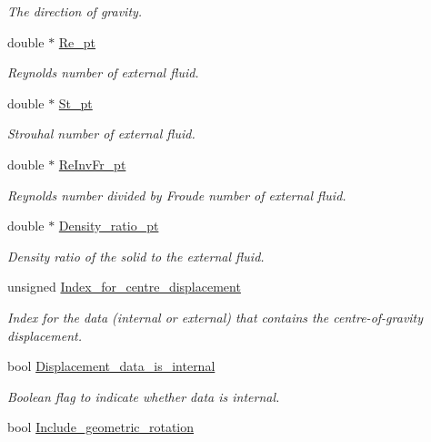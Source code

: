 \begin{DoxyCompactItemize}
\begin{DoxyCompactList}\small\item\em The direction of gravity. \end{DoxyCompactList}\item 
double $\ast$ \hyperlink{classoomph_1_1ImmersedRigidBodyElement_a90b0f294088777736260ffc4922af431}{Re\+\_\+pt}
\begin{DoxyCompactList}\small\item\em Reynolds number of external fluid. \end{DoxyCompactList}\item 
double $\ast$ \hyperlink{classoomph_1_1ImmersedRigidBodyElement_a200f179da0403fd3af0076200832a2ac}{St\+\_\+pt}
\begin{DoxyCompactList}\small\item\em Strouhal number of external fluid. \end{DoxyCompactList}\item 
double $\ast$ \hyperlink{classoomph_1_1ImmersedRigidBodyElement_a592e3846e9894c23cb6bb232d342eb20}{Re\+Inv\+Fr\+\_\+pt}
\begin{DoxyCompactList}\small\item\em Reynolds number divided by Froude number of external fluid. \end{DoxyCompactList}\item 
double $\ast$ \hyperlink{classoomph_1_1ImmersedRigidBodyElement_afbb9b7caffa3645d4d104611c4cf16df}{Density\+\_\+ratio\+\_\+pt}
\begin{DoxyCompactList}\small\item\em Density ratio of the solid to the external fluid. \end{DoxyCompactList}\item 
unsigned \hyperlink{classoomph_1_1ImmersedRigidBodyElement_a8fddc20d16203836484417775ef19b33}{Index\+\_\+for\+\_\+centre\+\_\+displacement}
\begin{DoxyCompactList}\small\item\em Index for the data (internal or external) that contains the centre-\/of-\/gravity displacement. \end{DoxyCompactList}\item 
bool \hyperlink{classoomph_1_1ImmersedRigidBodyElement_a6e68c8b6d7e33f0abbf93633f7e2ef69}{Displacement\+\_\+data\+\_\+is\+\_\+internal}
\begin{DoxyCompactList}\small\item\em Boolean flag to indicate whether data is internal. \end{DoxyCompactList}\item 
bool \hyperlink{classoomph_1_1ImmersedRigidBodyElement_a10ec0a0cfd976dac012d6cf0d73a1063}{Include\+\_\+geometric\+\_\+rotation}
\end{DoxyCompactItemize}
